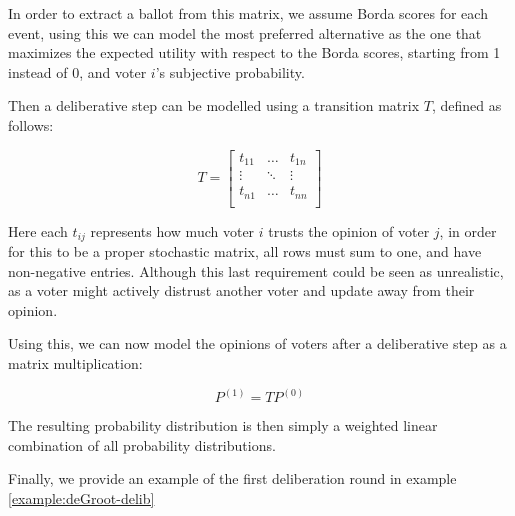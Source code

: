In order to extract a ballot from this matrix, we assume Borda scores for each event, using this we can model the most preferred alternative as the one that maximizes the expected utility with respect to the Borda scores, starting from 1 instead of 0, and voter $i$'s subjective probability.

Then a deliberative step can be modelled using a transition matrix $T$, defined as follows:

\[
	T=\begin{bmatrix}
		t_{11} & \dots  & t_{1n} \\
		\vdots & \ddots & \vdots \\
		t_{n1} & \dots  & t_{nn} \\
	\end{bmatrix}
\]

Here each $t_{ij}$ represents how much voter $i$ trusts the opinion of voter $j$, in order for this to be a proper stochastic matrix, all rows must sum to one, and have non-negative entries. Although this last requirement could be seen as unrealistic, as a voter might actively distrust another voter and update away from their opinion.

Using this, we can now model the opinions of voters after a deliberative step as a matrix multiplication:

\begin{equation}
	P^{(1)} = TP^{(0)}
	\label{eq:update_degroot}
\end{equation}

The resulting probability distribution is then simply a weighted linear combination of all probability distributions.

Finally, we provide an example of the first deliberation round in example \ref{example:deGroot-delib}

